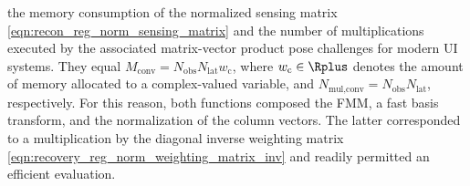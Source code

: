 the memory consumption of
the normalized sensing matrix
\eqref{eqn:recon_reg_norm_sensing_matrix} and
the number of
multiplications executed by
the associated matrix-vector product pose
challenges for
modern \ac{UI} systems.
They equal
$M_{\text{conv}} = N_{\text{obs}} N_{\text{lat}} w_{\text{c}}$, where
$w_{\text{c}} \in \Rplus$ denotes
the amount of
memory allocated to
a complex-valued variable, and
$N_{\text{mul},\text{conv}} = N_{\text{obs}} N_{\text{lat}}$,
respectively.
For this reason,
both functions composed
the \ac{FMM},
a fast basis transform, and
the normalization of
the column vectors.
The latter corresponded to
a multiplication by
the diagonal inverse weighting matrix
\eqref{eqn:recovery_reg_norm_weighting_matrix_inv} and readily permitted
an efficient evaluation.
